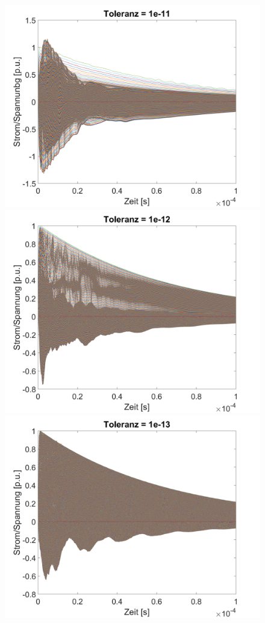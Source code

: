 \begin{refsection}
	\begin{figure}
	    \centering
	    \begin{minipage}{.5\textwidth}
	        \centering
	        \includegraphics[width=0.7\linewidth]{./trafo/images/svd11.png}
	    \end{minipage}%
	    \begin{minipage}{.5\textwidth}
	        \centering
	        \includegraphics[width=0.7\linewidth]{./trafo/images/svd12.png}
	    \end{minipage}
		\begin{minipage}{.5\textwidth}
	        \centering
	        \includegraphics[width=0.7\linewidth]{./trafo/images/svd13.png}

\end{minipage}
\end{figure}
\end{refsection}
